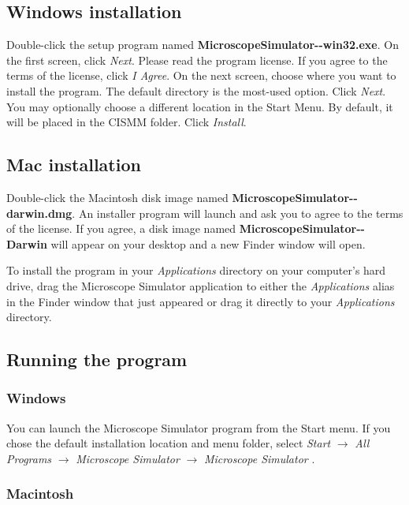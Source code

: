 \documentclass[11pt,titlepage,twoside]{article}
\begin{document}
\subsection{Windows installation}

Double-click the setup program named \textbf{MicroscopeSimulator-\ProgramVersionNoSpace-win32.exe}. On the first screen, click \emph{Next}. Please read the program license. If you agree to the terms of the license, click \emph{I Agree}. On the next screen, choose where you want to install the program. The default directory is the most-used option. Click \emph{Next}. You may optionally choose a different location in the Start Menu. By default, it will be placed in the CISMM folder. Click \emph{Install}.

\subsection{Mac installation}

Double-click the Macintosh disk image named \textbf{MicroscopeSimulator-\ProgramVersionNoSpace-darwin.dmg}. An installer program will launch and ask you to agree to the terms of the license. If you agree, a disk image named \textbf{MicroscopeSimulator-\ProgramVersionNoSpace-Darwin} will appear on your desktop and a new Finder window will open.

To install the program in your \emph{Applications} directory on your computer's hard drive, drag the Microscope Simulator \ProgramVersion application to either the \emph{Applications} alias in the Finder window that just appeared or drag it directly to your \emph{Applications} directory.

\subsection{Running the program}

\subsubsection{Windows}

You can launch the Microscope Simulator program from the Start menu. If you chose the default installation location and menu folder, select \emph{Start} $\rightarrow$ \emph{All Programs} $\rightarrow$ \emph{Microscope Simulator \ProgramVersionNoSpace} $\rightarrow$ \emph{Microscope Simulator \ProgramVersionNoSpace}.

\subsubsection{Macintosh}
\end{document}
